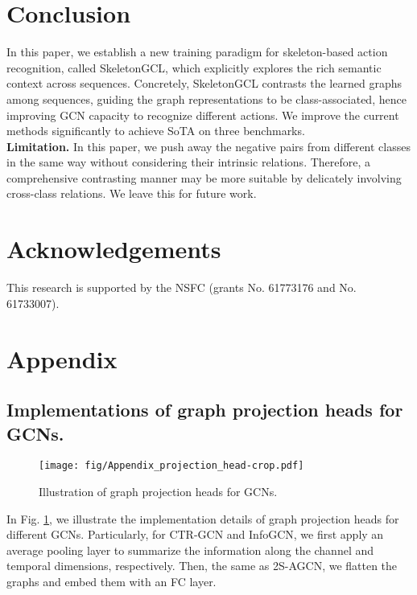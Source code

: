\documentclass{article} \usepackage{iclr2023_conference,times}
\begin{document}
\section{Conclusion}
In this paper, we establish a new training paradigm for skeleton-based action recognition, called SkeletonGCL, which explicitly explores the rich semantic context across sequences. Concretely, SkeletonGCL contrasts the learned graphs among sequences, guiding the graph representations to be class-associated, hence improving GCN capacity to recognize different actions. We improve the current methods significantly to achieve SoTA on three benchmarks. \\
\noindent \textbf{Limitation.} In this paper, we push away the negative pairs from different classes in the same way without considering their intrinsic relations. Therefore, a comprehensive contrasting manner may be more suitable by delicately involving cross-class relations. We leave this for future work.

\section*{Acknowledgements}
This research is supported by the NSFC (grants No. 61773176 and No. 61733007).



\section{Appendix}
\label{sec:appendix}
\subsection{Implementations of graph projection heads for GCNs.}
\label{appx:projection head}
\begin{figure}[h]
    \centering
    \texttt{[image: fig/Appendix\_projection\_head-crop.pdf]}
    \caption{Illustration of graph projection heads for GCNs.}
    \label{fig:projection_heads}
\end{figure}

In Fig. \ref{fig:projection_heads}, we illustrate the implementation details of graph projection heads for different GCNs. Particularly, for CTR-GCN and InfoGCN, we first apply an average pooling layer to summarize the information along the channel and temporal dimensions, respectively. Then, the same as 2S-AGCN, we flatten the graphs and embed them with an FC layer.
\end{document}

